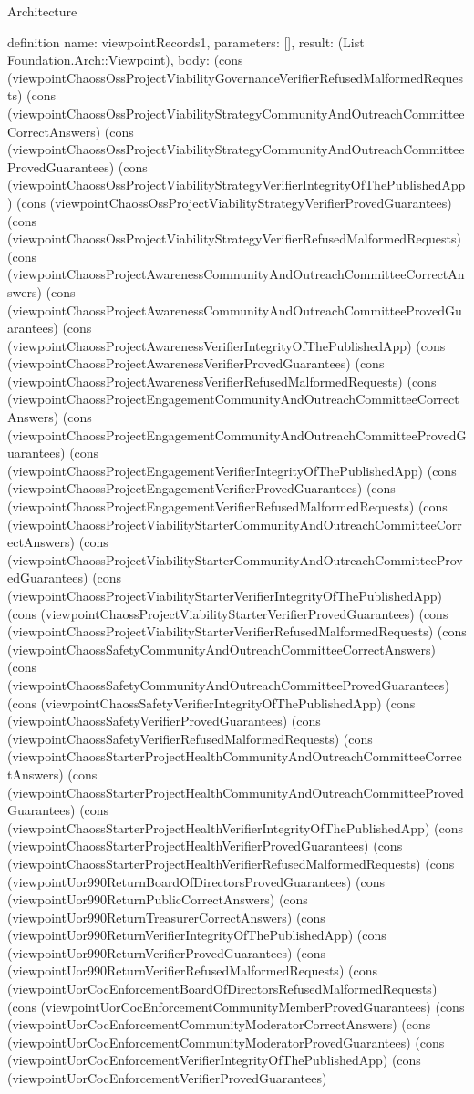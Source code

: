 \begin{lexlean}{Architecture}
\begin{semanticmodule}
definition{
  name: viewpointRecords1,
  parameters: [],
  result: (List Foundation.Arch::Viewpoint),
  body: (cons (viewpointChaossOssProjectViabilityGovernanceVerifierRefusedMalformedRequests) (cons (viewpointChaossOssProjectViabilityStrategyCommunityAndOutreachCommitteeCorrectAnswers) (cons (viewpointChaossOssProjectViabilityStrategyCommunityAndOutreachCommitteeProvedGuarantees) (cons (viewpointChaossOssProjectViabilityStrategyVerifierIntegrityOfThePublishedApp) (cons (viewpointChaossOssProjectViabilityStrategyVerifierProvedGuarantees) (cons (viewpointChaossOssProjectViabilityStrategyVerifierRefusedMalformedRequests) (cons (viewpointChaossProjectAwarenessCommunityAndOutreachCommitteeCorrectAnswers) (cons (viewpointChaossProjectAwarenessCommunityAndOutreachCommitteeProvedGuarantees) (cons (viewpointChaossProjectAwarenessVerifierIntegrityOfThePublishedApp) (cons (viewpointChaossProjectAwarenessVerifierProvedGuarantees) (cons (viewpointChaossProjectAwarenessVerifierRefusedMalformedRequests) (cons (viewpointChaossProjectEngagementCommunityAndOutreachCommitteeCorrectAnswers) (cons (viewpointChaossProjectEngagementCommunityAndOutreachCommitteeProvedGuarantees) (cons (viewpointChaossProjectEngagementVerifierIntegrityOfThePublishedApp) (cons (viewpointChaossProjectEngagementVerifierProvedGuarantees) (cons (viewpointChaossProjectEngagementVerifierRefusedMalformedRequests) (cons (viewpointChaossProjectViabilityStarterCommunityAndOutreachCommitteeCorrectAnswers) (cons (viewpointChaossProjectViabilityStarterCommunityAndOutreachCommitteeProvedGuarantees) (cons (viewpointChaossProjectViabilityStarterVerifierIntegrityOfThePublishedApp) (cons (viewpointChaossProjectViabilityStarterVerifierProvedGuarantees) (cons (viewpointChaossProjectViabilityStarterVerifierRefusedMalformedRequests) (cons (viewpointChaossSafetyCommunityAndOutreachCommitteeCorrectAnswers) (cons (viewpointChaossSafetyCommunityAndOutreachCommitteeProvedGuarantees) (cons (viewpointChaossSafetyVerifierIntegrityOfThePublishedApp) (cons (viewpointChaossSafetyVerifierProvedGuarantees) (cons (viewpointChaossSafetyVerifierRefusedMalformedRequests) (cons (viewpointChaossStarterProjectHealthCommunityAndOutreachCommitteeCorrectAnswers) (cons (viewpointChaossStarterProjectHealthCommunityAndOutreachCommitteeProvedGuarantees) (cons (viewpointChaossStarterProjectHealthVerifierIntegrityOfThePublishedApp) (cons (viewpointChaossStarterProjectHealthVerifierProvedGuarantees) (cons (viewpointChaossStarterProjectHealthVerifierRefusedMalformedRequests) (cons (viewpointUor990ReturnBoardOfDirectorsProvedGuarantees) (cons (viewpointUor990ReturnPublicCorrectAnswers) (cons (viewpointUor990ReturnTreasurerCorrectAnswers) (cons (viewpointUor990ReturnVerifierIntegrityOfThePublishedApp) (cons (viewpointUor990ReturnVerifierProvedGuarantees) (cons (viewpointUor990ReturnVerifierRefusedMalformedRequests) (cons (viewpointUorCocEnforcementBoardOfDirectorsRefusedMalformedRequests) (cons (viewpointUorCocEnforcementCommunityMemberProvedGuarantees) (cons (viewpointUorCocEnforcementCommunityModeratorCorrectAnswers) (cons (viewpointUorCocEnforcementCommunityModeratorProvedGuarantees) (cons (viewpointUorCocEnforcementVerifierIntegrityOfThePublishedApp) (cons (viewpointUorCocEnforcementVerifierProvedGuarantees) }
\end{semanticmodule}
\end{lexlean}
